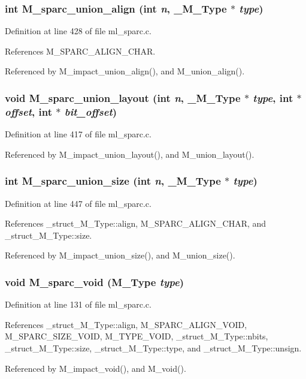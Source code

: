 \subsubsection{\setlength{\rightskip}{0pt plus 5cm}int M\_\-sparc\_\-union\_\-align (int {\em n}, \bf{\_\-M\_\-Type} $\ast$ {\em type})}\label{ml__sparc_8c_3ce9b762400b8788a0bbb7eefe5dada8}




Definition at line 428 of file ml\_\-sparc.c.

References M\_\-SPARC\_\-ALIGN\_\-CHAR.

Referenced by M\_\-impact\_\-union\_\-align(), and M\_\-union\_\-align().
\subsubsection{\setlength{\rightskip}{0pt plus 5cm}void M\_\-sparc\_\-union\_\-layout (int {\em n}, \bf{\_\-M\_\-Type} $\ast$ {\em type}, int $\ast$ {\em offset}, int $\ast$ {\em bit\_\-offset})}\label{ml__sparc_8c_84f687dcab9c62fa0849f2b1f6b18163}




Definition at line 417 of file ml\_\-sparc.c.

Referenced by M\_\-impact\_\-union\_\-layout(), and M\_\-union\_\-layout().
\subsubsection{\setlength{\rightskip}{0pt plus 5cm}int M\_\-sparc\_\-union\_\-size (int {\em n}, \bf{\_\-M\_\-Type} $\ast$ {\em type})}\label{ml__sparc_8c_4f771591d9066d35c1cc7e49553f4285}




Definition at line 447 of file ml\_\-sparc.c.

References \_\-struct\_\-M\_\-Type::align, M\_\-SPARC\_\-ALIGN\_\-CHAR, and \_\-struct\_\-M\_\-Type::size.

Referenced by M\_\-impact\_\-union\_\-size(), and M\_\-union\_\-size().
\subsubsection{\setlength{\rightskip}{0pt plus 5cm}void M\_\-sparc\_\-void (\bf{M\_\-Type} {\em type})}\label{ml__sparc_8c_d2bd892fac17dc08374320f02bc6ebf4}




Definition at line 131 of file ml\_\-sparc.c.

References \_\-struct\_\-M\_\-Type::align, M\_\-SPARC\_\-ALIGN\_\-VOID, M\_\-SPARC\_\-SIZE\_\-VOID, M\_\-TYPE\_\-VOID, \_\-struct\_\-M\_\-Type::nbits, \_\-struct\_\-M\_\-Type::size, \_\-struct\_\-M\_\-Type::type, and \_\-struct\_\-M\_\-Type::unsign.

Referenced by M\_\-impact\_\-void(), and M\_\-void().